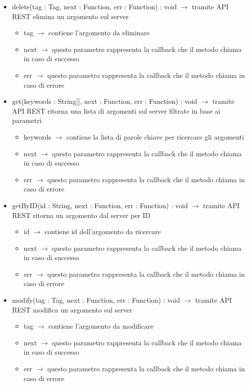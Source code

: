 \begin{description}
\begin{itemize}
	\item delete(tag : Tag, next : Function, err : Function) : void $\rightarrow$ tramite API REST elimina un argomento sul server\begin{itemize}
		\item tag $\rightarrow$ contiene l'argomento da eliminare
		\item next $\rightarrow$ questo parametro rappresenta la callback che il metodo chiama in caso di successo
		\item err $\rightarrow$ questo parametro rappresenta la callback che il metodo chiama in caso di errore
	\end{itemize}
	
	\item get(keywords : String[], next : Function, err : Function) : void $\rightarrow$ tramite API REST ritorna una lista di argomenti sul server filtrate in base ai parametri\begin{itemize}
		\item keywords $\rightarrow$ contiene la lista di parole chiave per ricercare gli argomenti
		\item next $\rightarrow$ questo parametro rappresenta la callback che il metodo chiama in caso di successo
		\item err $\rightarrow$ questo parametro rappresenta la callback che il metodo chiama in caso di errore
	\end{itemize}
	
	\item getByID(id : String, next : Function, err : Function) : void $\rightarrow$ tramite API REST ritorna un argomento dal server per ID\begin{itemize}
		\item id $\rightarrow$ contiene id dell'argomento da ricercare
		\item next $\rightarrow$ questo parametro rappresenta la callback che il metodo chiama in caso di successo
		\item err $\rightarrow$ questo parametro rappresenta la callback che il metodo chiama in caso di errore
	\end{itemize}
	
	\item modify(tag : Tag, next : Function, err : Function) : void $\rightarrow$ tramite API REST modifica un argomento sul server\begin{itemize}
		\item tag $\rightarrow$ contiene l'argomento da modificare
		\item next $\rightarrow$ questo parametro rappresenta la callback che il metodo chiama in caso di successo
		\item err $\rightarrow$ questo parametro rappresenta la callback che il metodo chiama in caso di errore
	\end{itemize}
	

\end{itemize}
\end{description}

